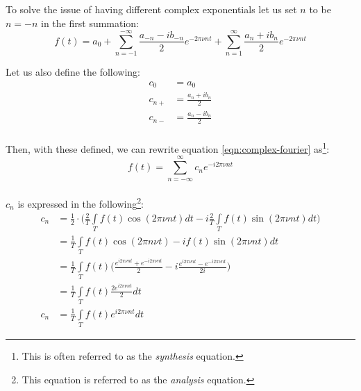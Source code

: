 \documentclass{article}
\begin{document}
To solve the issue of having different complex exponentials let us set $n$ to
be $n = -n$ in the first summation:
\begin{equation}
f(t) = a_0 + \sum_{n=-1}^{-\infty} \frac{a_{-n} - i b_{-n}}{2} e^{- 2 \pi \nu n
t} + \sum_{n=1}^{\infty} \frac{a_n + i b_n}{2} e^{-2 \pi \nu n t}
\label{eqn:complex-fourier}
\end{equation}

Let us also define the following:
\begin{equation*}
	\begin{aligned}
		c_0 &= a_0 \\
		c_{n+} &= \frac{a_n + i b_n}{2} \\
		c_{n-} &= \frac{a_n - i b_n}{2} \\
	\end{aligned}
\end{equation*}

Then, with these defined, we can rewrite equation \ref{eqn:complex-fourier}
as\footnote{This is often referred to as the \textit{synthesis} equation.}:
\begin{equation}
	f(t) = \sum^{\infty}_{n = - \infty} c_n e^{-i 2 \pi \nu n t}
	\label{eqn:complex-fourier-series}
\end{equation}

\paragraph*{}
$c_n$ is expressed in the following\footnote{This equation is referred to as
the \textit{analysis} equation.}:
\begin{equation}
	\begin{aligned}
		c_n &= 
		\frac{1}{2} \cdot \bigg( \frac{2}{T} \int\limits_T f(t) \cos(2 \pi \nu n t) dt
		- i \frac{2}{T} \int\limits_T f(t) \sin(2 \pi \nu n t) dt \bigg) \\
		&= \frac{1}{T} \int\limits_T f(t) \cos(2 \pi n \nu t) - i f(t) \sin(2 \pi \nu
		n t) dt \\
		&= \frac{1}{T} \int\limits_T f(t) \bigg( \frac{e^{i 2 \pi \nu n t} + e^{-i 2
		\pi \nu n t}}{2} - i \frac{e^{i 2 \pi \nu n t} - e^{-i 2 \pi \nu n
		t}}{2i} \bigg) \\
		&= \frac{1}{T} \int\limits_T f(t) \frac{2 e^{i 2 \pi \nu n t}}{2} dt \\
		c_n &= \frac{1}{T} \int\limits_T f(t) e^{i 2 \pi \nu n t} dt
	\end{aligned}
	\label{eqn:fourier-analysis}
\end{equation}
\end{document}
